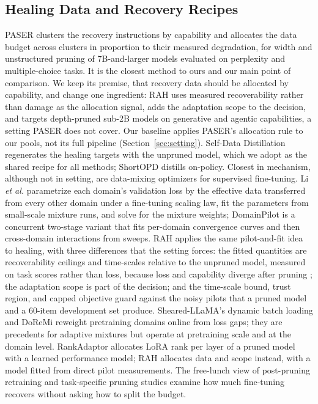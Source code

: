 \documentclass{ieeeaccess}
\newcommand{\RAH}{RAH}
\begin{document}
\subsection{Healing Data and Recovery Recipes}
PASER \cite{he2026paser} clusters the recovery instructions by capability and allocates the data budget across clusters in proportion to their measured degradation, for width and unstructured pruning of 7B-and-larger models evaluated on perplexity and multiple-choice tasks. It is the closest method to ours and our main point of comparison. We keep its premise, that recovery data should be allocated by capability, and change one ingredient: \RAH{} uses measured recoverability rather than damage as the allocation signal, adds the adaptation scope to the decision, and targets depth-pruned sub-2B models on generative and agentic capabilities, a setting PASER does not cover. Our baseline applies PASER's allocation rule to our pools, not its full pipeline (Section~\ref{sec:setting}). Self-Data Distillation \cite{thangarasa2024selfdata} regenerates the healing targets with the unpruned model, which we adopt as the shared recipe for all methods; ShortOPD \cite{shortopd2026} distills on-policy. Closest in mechanism, although not in setting, are data-mixing optimizers for supervised fine-tuning. Li \emph{et al.} \cite{li2025datamixing} parametrize each domain's validation loss by the effective data transferred from every other domain under a fine-tuning scaling law, fit the parameters from small-scale mixture runs, and solve for the mixture weights; DomainPilot \cite{domainpilot2026} is a concurrent two-stage variant that fits per-domain convergence curves and then cross-domain interactions from sweeps. \RAH{} applies the same pilot-and-fit idea to healing, with three differences that the setting forces: the fitted quantities are recoverability ceilings and time-scales relative to the unpruned model, measured on task scores rather than loss, because loss and capability diverge after pruning \cite{jaiswal2024truth}; the adaptation scope is part of the decision; and the time-scale bound, trust region, and capped objective guard against the noisy pilots that a pruned model and a 60-item development set produce. Sheared-LLaMA's dynamic batch loading \cite{xia2024sheared} and DoReMi \cite{xie2023doremi} reweight pretraining domains online from loss gaps; they are precedents for adaptive mixtures but operate at pretraining scale and at the domain level. RankAdaptor \cite{rankadaptor2024} allocates LoRA rank per layer of a pruned model with a learned performance model; \RAH{} allocates data and scope instead, with a model fitted from direct pilot measurements. The free-lunch view of post-pruning retraining \cite{freelunch2025} and task-specific pruning studies \cite{taskpruning2026} examine how much fine-tuning recovers without asking how to split the budget.
\end{document}
